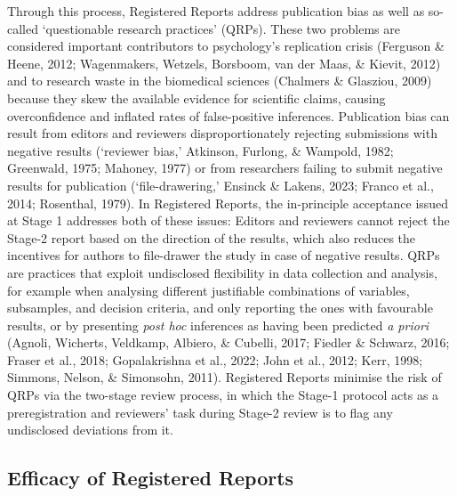 \documentclass[
  ,man,mask,floatsintext]{apa6}
\begin{document}
Through this process, Registered Reports address publication bias as well as so-called `questionable research practices' (QRPs).
These two problems are considered important contributors to psychology's replication crisis (Ferguson \& Heene, 2012; Wagenmakers, Wetzels, Borsboom, van der Maas, \& Kievit, 2012) and to research waste in the biomedical sciences (Chalmers \& Glasziou, 2009) because they skew the available evidence for scientific claims, causing overconfidence and inflated rates of false-positive inferences.
Publication bias can result from editors and reviewers disproportionately rejecting submissions with negative results (`reviewer bias,' Atkinson, Furlong, \& Wampold, 1982; Greenwald, 1975; Mahoney, 1977) or from researchers failing to submit negative results for publication (`file-drawering,' Ensinck \& Lakens, 2023; Franco et al., 2014; Rosenthal, 1979).
In Registered Reports, the
in-principle acceptance issued at Stage 1 addresses both of these issues:
Editors and reviewers cannot reject the Stage-2 report based on the direction of the results, which also reduces the incentives for authors to file-drawer the study in case of negative results.
QRPs are practices that exploit undisclosed flexibility in data collection and analysis, for example when analysing different justifiable combinations of variables, subsamples, and decision criteria, and only reporting the ones with favourable results, or by presenting \emph{post hoc} inferences as having been predicted \emph{a priori} (Agnoli, Wicherts, Veldkamp, Albiero, \& Cubelli, 2017; Fiedler \& Schwarz, 2016; Fraser et al., 2018; Gopalakrishna et al., 2022; John et al., 2012; Kerr, 1998; Simmons, Nelson, \& Simonsohn, 2011).
Registered Reports minimise the risk of QRPs via the two-stage review process, in which the Stage-1 protocol acts as a preregistration and reviewers' task during Stage-2 review is to flag any undisclosed deviations from it.

\hypertarget{efficacy-of-registered-reports}{%
\subsection{Efficacy of Registered Reports}\label{efficacy-of-registered-reports}}
\end{document}
